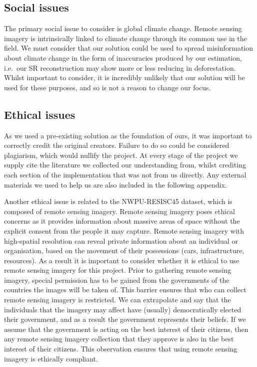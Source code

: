 \begin{appendices}
\subsection{Social issues}
The primary social issue to consider is global climate change. Remote sensing imagery is intrinsically linked to climate change through its common use in the field. We must consider that our solution could be used to spread misinformation about climate change in the form of inaccuracies produced by our estimation, i.e.\ our SR reconstruction may show more or less reducing in deforestation. Whilst important to consider, it is incredibly unlikely that our solution will be used for these purposes, and so is not a reason to change our focus.

\subsection{Ethical issues}
As we used a pre-existing solution as the foundation of ours, it was important to correctly credit the original creators. Failure to do so could be considered plagiarism, which would nullify the project. At every stage of the project we supply cite the literature we collected our understanding from, whilst crediting each section of the implementation that was not from us directly. Any external materials we used to help us are also included in the following appendix.

Another ethical issue is related to the NWPU-RESISC45 dataset, which is composed of remote sensing imagery. Remote sensing imagery poses ethical concerns as it provides information about massive areas of space without the explicit consent from the people it may capture. Remote sensing imagery with high-spatial resolution can reveal private information about an individual or organisation, based on the movement of their possessions (cars, infrastructure, resources). As a result it is important to consider whether it is ethical to use remote sensing imagery for this project. Prior to gathering remote sensing imagery, special permission has to be gained from the governments of the countries the images will be taken of. This barrier ensures that who can collect remote sensing imagery is restricted. We can extrapolate and say that the individuals that the imagery may affect have (usually) democratically elected their government, and as a result the government represents their beliefs. If we assume that the government is acting on the best interest of their citizens, then any remote sensing imagery collection that they approve is also in the best interest of their citizens. This observation ensures that using remote sensing imagery is ethically compliant.


\end{appendices}
